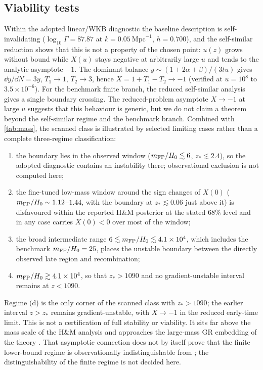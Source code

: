 \subsection{Viability tests}\label{sec:viability}
Within the adopted linear/WKB diagnostic the baseline description is self-invalidating ($\log_{10}\Gamma=87.87$ at $k=0.05\ \mathrm{Mpc}^{-1}$, $h=0.700$), and the self-similar reduction shows that this is not a property of the chosen point: $u(z)$ grows without bound while $X(u)$ stays negative at arbitrarily large $u$ and tends to the analytic asymptote $-1$. The dominant balance $y\sim(1+2\alpha+\beta)/(3tu)$ gives $\dd y/\dd N=3y$, $T_1\to1$, $T_2\to3$, hence $X=1+T_1-T_2\to-1$ (verified at $u=10^8$ to $3.5\times10^{-6}$). For the benchmark finite branch, the reduced self-similar analysis gives a single boundary crossing. The reduced-problem asymptote $X\to-1$ at large $u$ suggests that this behaviour is generic, but we do not claim a theorem beyond the self-similar regime and the benchmark branch. Combined with \cref{tab:mass}, the scanned class is illustrated by selected limiting cases rather than a complete three-regime classification:
\begin{enumerate}
\item[(a)] the boundary lies in the observed window ($m_{\mathrm{FP}}/H_0\lesssim6$, $z_*\lesssim2.4$), so the adopted diagnostic contains an instability there; observational exclusion is not computed here;
\item[(b)] the fine-tuned low-mass window around the sign changes of $X(0)$ ($m_{\mathrm{FP}}/H_0\sim1.12$--$1.44$, with the boundary at $z_*\lesssim0.06$ just above it) is disfavoured within the reported H\&M posterior at the stated $68\%$ level and in any case carries $X(0)<0$ over most of the window;
\item[(c)] the broad intermediate range $6\lesssim m_{\mathrm{FP}}/H_0\lesssim4.1\times10^4$, which includes the benchmark $m_{\mathrm{FP}}/H_0=25$, places the unstable boundary between the directly observed late region and recombination;
\item[(d)] $m_{\mathrm{FP}}/H_0\gtrsim4.1\times10^4$, so that $z_*>1090$ and no gradient-unstable interval remains at $z<1090$.
\end{enumerate}
Regime (d) is the only corner of the scanned class with $z_*>1090$; the earlier interval $z>z_*$ remains gradient-unstable, with $X\to-1$ in the reduced early-time limit. This is not a certification of full stability or viability. It sits far above the mass scale of the H\&M analysis and approaches the large-mass GR embedding of the theory \citep{Hogas2021}. That asymptotic connection does not by itself prove that the finite lower-bound regime is observationally indistinguishable from \LCDM{}; the distinguishability of the finite regime is not decided here.

